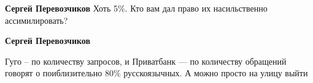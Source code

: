 \begin{itemize}
\begin{itemize}
\textbf{Сергей Перевозчиков}
Хоть 5\%. Кто вам дал право их насильственно ассимилировать?

\textbf{Сергей Перевозчиков} 

Гуго – по количеству запросов, и Приватбанк — по количеству обращений говорят о
поиблизительно 80\% русскоязычных. А можно просто на улицу выйти

\end{itemize} %

\end{itemize} %
